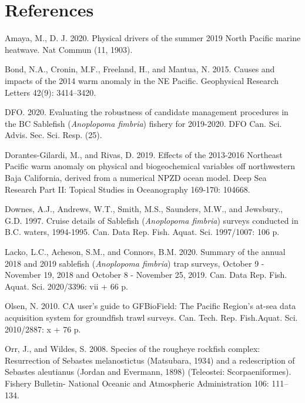 \documentclass[12pt]{article}\usepackage[]{graphicx}\usepackage[]{color}
\begin{document}
\clearpage

\hypertarget{references}{%
\section{References}\label{references}}

\noindent \vspace{-2em} \setlength{\parindent}{-0.2in} \setlength{\leftskip}{0.2in} \setlength{\parskip}{8pt}

\hypertarget{refs}{}
\leavevmode\hypertarget{ref-Amaya2020}{}%
Amaya, M., D. J. 2020. Physical drivers of the summer 2019 North Pacific marine heatwave. Nat Commun (11, 1903).

\leavevmode\hypertarget{ref-Bond2015}{}%
Bond, N.A., Cronin, M.F., Freeland, H., and Mantua, N. 2015. Causes and impacts of the 2014 warm anomaly in the NE Pacific. Geophysical Research Letters 42(9): 3414--3420.

\leavevmode\hypertarget{ref-DFO2020}{}%
DFO. 2020. Evaluating the robustness of candidate management procedures in the BC Sablefish (\emph{Anoplopoma fimbria}) fishery for 2019-2020. DFO Can. Sci. Advis. Sec. Sci. Resp. (25).

\leavevmode\hypertarget{ref-DORANTESGILARD2020}{}%
Dorantes-Gilardi, M., and Rivas, D. 2019. Effects of the 2013-2016 Northeast Pacific warm anomaly on physical and biogeochemical variables off northwestern Baja California, derived from a numerical NPZD ocean model. Deep Sea Research Part II: Topical Studies in Oceanography 169-170: 104668.

\leavevmode\hypertarget{ref-Downes1997}{}%
Downes, A.J., Andrews, W.T., Smith, M.S., Saunders, M.W., and Jewsbury., G.D. 1997. Cruise details of Sablefish (\emph{Anoplopoma fimbria}) surveys conducted in B.C. waters, 1994-1995. Can. Data Rep. Fish. Aquat. Sci. 1997/1007: 106 p.

\leavevmode\hypertarget{ref-Lacko2020}{}%
Lacko, L.C., Acheson, S.M., and Connors, B.M. 2020. Summary of the annual 2018 and 2019 sablefish (\emph{Anoplopoma fimbria}) trap surveys, October 9 - November 19, 2018 and October 8 - November 25, 2019. Can. Data Rep. Fish. Aquat. Sci. 2020/3396: vii + 66 p.

\leavevmode\hypertarget{ref-Olsen2010}{}%
Olsen, N. 2010. CA user's guide to GFBioField: The Pacific Region's at-sea data acquisition system for groundfish trawl surveys. Can. Tech. Rep. Fish.Aquat. Sci. 2010/2887: x + 76 p.

\leavevmode\hypertarget{ref-Orr2008}{}%
Orr, J., and Wildes, S. 2008. Species of the rougheye rockfish complex: Resurrection of Sebastes melanostictus (Matsubara, 1934) and a redescription of Sebastes aleutianus (Jordan and Evermann, 1898) (Teleostei: Scorpaeniformes). Fishery Bulletin- National Oceanic and Atmospheric Administration 106: 111--134.
\end{document}
